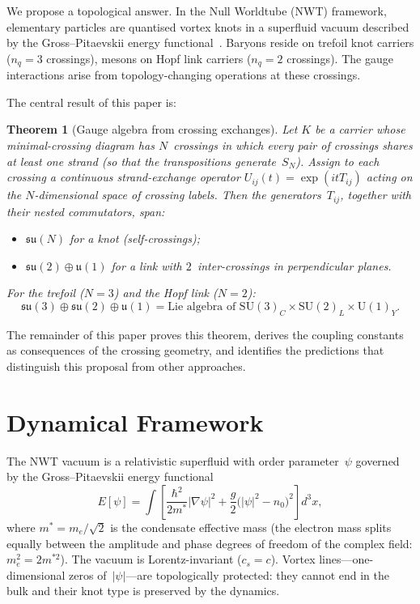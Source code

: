 \documentclass[11pt,a4paper]{article}
\newtheorem{theorem}{Theorem}
\begin{document}
We propose a topological answer.  In the Null Worldtube (NWT)
framework, elementary particles are quantised vortex knots in a
superfluid vacuum described by the Gross--Pitaevskii energy
functional~\cite{paper5,paper6,paper7}.  Baryons reside on
trefoil knot carriers ($n_q = 3$ crossings), mesons on Hopf link
carriers ($n_q = 2$ crossings).  The gauge interactions arise
from topology-changing operations at these crossings.

The central result of this paper is:

\begin{theorem}[Gauge algebra from crossing exchanges]
\label{thm:main}
Let $K$ be a carrier whose minimal-crossing diagram has
$N$~crossings in which every pair of crossings shares at least
one strand (so that the transpositions generate~$S_N$).
Assign to each crossing a continuous strand-exchange operator
$U_{ij}(t) = \exp(itT_{ij})$ acting on the $N$-dimensional
space of crossing labels.  Then the generators~$T_{ij}$, together
with their nested commutators, span:
\begin{itemize}
\item $\mathfrak{su}(N)$ for a knot (self-crossings);
\item $\mathfrak{su}(2) \oplus \mathfrak{u}(1)$ for a
  link with $2$~inter-crossings in perpendicular planes.
\end{itemize}
For the trefoil ($N=3$) and the Hopf link ($N=2$):
\begin{equation}
  \mathfrak{su}(3) \oplus \mathfrak{su}(2) \oplus
  \mathfrak{u}(1)
  = \text{Lie algebra of }
  \mathrm{SU}(3)_C \times \mathrm{SU}(2)_L \times
  \mathrm{U}(1)_Y.
  \label{eq:gauge}
\end{equation}
\end{theorem}

The remainder of this paper proves this theorem, derives the
coupling constants as consequences of the crossing geometry, and
identifies the predictions that distinguish this proposal from
other approaches.


\section{Dynamical Framework}
\label{sec:framework}

The NWT vacuum is a relativistic superfluid with order
parameter~$\psi$ governed by the Gross--Pitaevskii energy
functional
\begin{equation}
  E[\psi] = \int \left[
    \frac{\hbar^2}{2m^*} |\nabla\psi|^2
    + \frac{g}{2}\bigl(|\psi|^2 - n_0\bigr)^2
  \right] d^3x,
  \label{eq:GPE}
\end{equation}
where $m^* = m_e/\sqrt{2}$ is the condensate effective mass
(the electron mass splits equally between the amplitude and phase
degrees of freedom of the complex field: $m_e^2 = 2m^{*2}$).
The vacuum is Lorentz-invariant ($c_s = c$).
Vortex lines---one-dimensional zeros of~$|\psi|$---are
topologically protected: they cannot end in the bulk and their
knot type is preserved by the dynamics.
\end{document}
